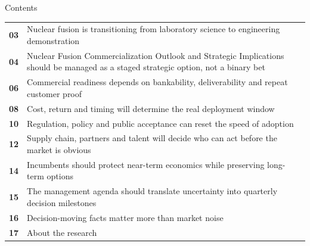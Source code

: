 \documentclass[10pt,a4paper]{article}
\begin{document}
\clearpage
{\sffamily\fontsize{26}{31}\selectfont\color{BONavy} Contents}\par\vspace{10pt}
\begin{tabularx}{\linewidth}{p{14mm}Y}
\textcolor{BOGreen}{\bfseries 03} & Nuclear fusion is transitioning from laboratory science to engineering demonstration \\[5pt]
\textcolor{BOGreen}{\bfseries 04} & Nuclear Fusion Commercialization Outlook and Strategic Implications should be managed as a staged strategic option, not a binary bet \\[5pt]
\textcolor{BOGreen}{\bfseries 06} & Commercial readiness depends on bankability, deliverability and repeat customer proof \\[5pt]
\textcolor{BOGreen}{\bfseries 08} & Cost, return and timing will determine the real deployment window \\[5pt]
\textcolor{BOGreen}{\bfseries 10} & Regulation, policy and public acceptance can reset the speed of adoption \\[5pt]
\textcolor{BOGreen}{\bfseries 12} & Supply chain, partners and talent will decide who can act before the market is obvious \\[5pt]
\textcolor{BOGreen}{\bfseries 14} & Incumbents should protect near-term economics while preserving long-term options \\[5pt]
\textcolor{BOGreen}{\bfseries 15} & The management agenda should translate uncertainty into quarterly decision milestones \\[5pt]
\textcolor{BOGreen}{\bfseries 16} & Decision-moving facts matter more than market noise \\[5pt]
\textcolor{BOGreen}{\bfseries 17} & About the research \\[5pt]
\end{tabularx}
\clearpage
\end{document}
